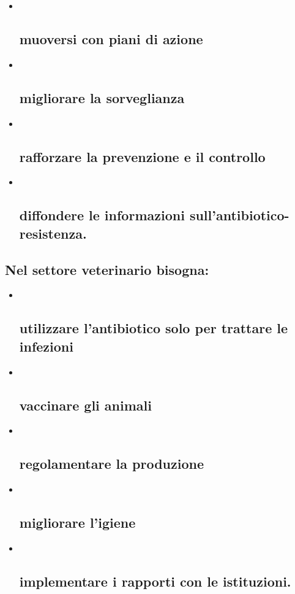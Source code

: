 \documentclass[]{article}
\begin{document}
\begin{itemize}
\item ~
  \subsection{muoversi con piani di
  azione}\label{muoversi-con-piani-di-azione}
\item ~
  \subsection{migliorare la
  sorveglianza}\label{migliorare-la-sorveglianza}
\item ~
  \subsection{rafforzare la prevenzione e il
  controllo}\label{rafforzare-la-prevenzione-e-il-controllo}
\item ~
  \subsection{diffondere le informazioni
  sull'antibiotico-resistenza.}\label{diffondere-le-informazioni-sullantibiotico-resistenza.}
\end{itemize}

\subsection{\texorpdfstring{Nel \textbf{settore veterinario}
bisogna:}{Nel settore veterinario bisogna:}}\label{nel-settore-veterinario-bisogna}

\begin{itemize}
\item ~
  \subsection{utilizzare l'antibiotico solo per trattare le
  infezioni}\label{utilizzare-lantibiotico-solo-per-trattare-le-infezioni}
\item ~
  \subsection{vaccinare gli animali}\label{vaccinare-gli-animali}
\item ~
  \subsection{regolamentare la
  produzione}\label{regolamentare-la-produzione}
\item ~
  \subsection{migliorare l'igiene}\label{migliorare-ligiene}
\item ~
  \subsection{implementare i rapporti con le
  istituzioni.}\label{implementare-i-rapporti-con-le-istituzioni.}
\end{itemize}
\end{document}
